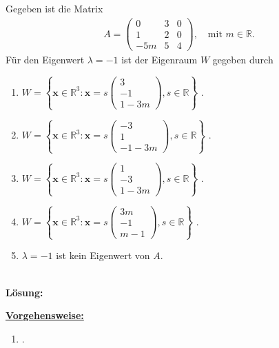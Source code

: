 \subsection*{}
Gegeben ist die Matrix
\begin{align*}
	A =
	\begin{pmatrix}
		0 & 3 & 0 \\
		1 & 2 & 0 \\
		-5m & 5 & 4
	\end{pmatrix}
	, 
	\quad 
	\textrm{mit } m \in \mathbb{R}.
\end{align*}
Für den Eigenwert $ \lambda = -1 $ ist der Eigenraum $ W $ gegeben durch
\renewcommand{\labelenumi}{(\alph{enumi})}
\begin{enumerate}
	\item 
	$ W
	=
	\left\{
	\textbf{x} \in \mathbb{R}^3
	:
	\textbf{x}
	=
	s 
	\begin{pmatrix}
		3 \\ -1 \\ 1 - 3m
	\end{pmatrix},
	s \in \mathbb{R}
	\right\}
	$
	.
	\item 
	$ W
	=
	\left\{
	\textbf{x} \in \mathbb{R}^3
	:
	\textbf{x}
	=
	s	 
	\begin{pmatrix}
		-3 \\ 1 \\ -1 - 3m
	\end{pmatrix},
	s \in \mathbb{R}
	\right\}
	$
	.
	\item
	$ W
	=
	\left\{
	\textbf{x} \in \mathbb{R}^3
	:
	\textbf{x}
	=
	s	 
	\begin{pmatrix}
		1 \\ -3 \\ 1 - 3m
	\end{pmatrix},
	s \in \mathbb{R}
	\right\}
	$
	.
	\item
	$ W
	=
	\left\{
	\textbf{x} \in \mathbb{R}^3
	:
	\textbf{x}
	=
	s	 
	\begin{pmatrix}
		3m \\ -1 \\ m-1
	\end{pmatrix},
	s \in \mathbb{R}
	\right\}
	$
	.
	\item
	$ \lambda = -1 $ ist kein Eigenwert von $ A $.
\end{enumerate}
\ \\
\textbf{Lösung:}
\begin{mdframed}
\underline{\textbf{Vorgehensweise:}}
\renewcommand{\labelenumi}{\theenumi.}
\begin{enumerate}
\item .
\end{enumerate}
\end{mdframed}

